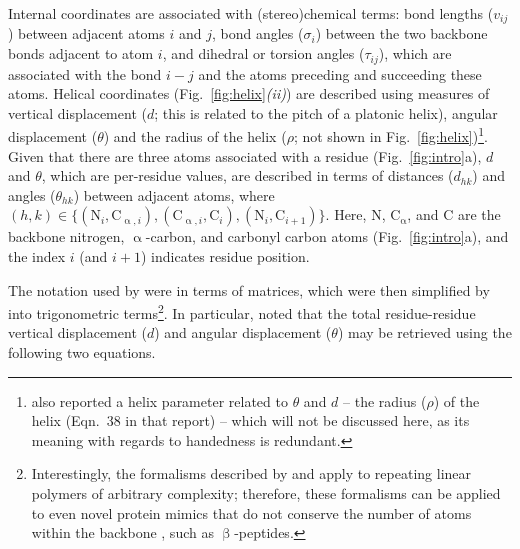 \documentclass[fleqn,10pt]{wlpeerj} %
\newcommand{\Fig}[1]{Fig.~\ref{#1}}
\begin{document}
Internal coordinates are associated with (stereo)chemical terms: bond lengths ($v_{ij}$) between adjacent atoms $i$ and $j$, bond angles ($\sigma_{i}$) between the two backbone bonds adjacent to atom $i$, and dihedral or torsion angles ($\tau_{ij}$), which are associated with the bond $i-j$ and the atoms preceding and succeeding these atoms. Helical coordinates (\Fig{fig:helix}\textit{(ii)}) are described using measures of vertical displacement ($d$; this is related to the pitch of a platonic helix), angular displacement ($\theta$) and the radius of the helix ($\rho$; not shown in \Fig{fig:helix})\footnote{\cite{Miyazawa1961} also reported a helix parameter related to $\theta$ and $d$ -- the radius ($\rho$) of the helix (Eqn.~38 in that report) -- which will not be discussed here, as its meaning with regards to handedness is redundant.}. Given that there are three atoms associated with a residue (\Fig{fig:intro}a), $d$ and $\theta$, which are per-residue values, are described in terms of distances ($d_{hk}$) and angles ($\theta_{hk}$) between adjacent atoms, where  $\left(h,k\right)\in\{\left(\textrm{N}_i,\textrm{C}_{\upalpha,i}\right), \left(\textrm{C}_{\upalpha,i},\textrm{C}_i\right), \left(\textrm{N}_i,\textrm{C}_{i+1}\right)\}$. Here, 
$\textrm{N}$, $\textrm{C}_{\upalpha}$, and $\textrm{C}$ are the backbone nitrogen, $\upalpha$-carbon, and carbonyl carbon atoms (\Fig{fig:intro}a), and the index $i$ (and $i+1$) indicates residue position. 

The notation used by \cite{Shimanouchi1955} were in terms of matrices, which were then simplified by \cite{Miyazawa1961} into trigonometric terms\footnote{Interestingly, the formalisms described by \cite{Miyazawa1961} and \cite{Shimanouchi1955} apply to repeating linear polymers of arbitrary complexity; therefore, these formalisms can be applied to even novel protein mimics that do not conserve the number of atoms within the backbone \citep{Kandakov2013}, such as $\upbeta$-peptides.}. In particular, \cite{Miyazawa1961} noted that the total residue-residue vertical displacement ($d$) and angular displacement ($\theta$) may be retrieved using the following two equations.
\end{document}
